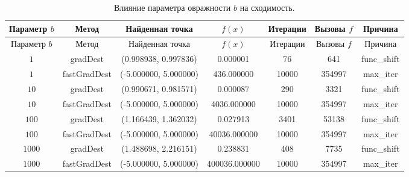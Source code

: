 \begin{longtable}{|c|c|c|c|c|c|c|}
\caption{Влияние параметра овражности $b$ на сходимость.}\label{tab:rosenbrock}\\
\hline
Параметр $b$ & Метод & Найденная точка & $f(x)$ & Итерации & Вызовы $f$ & Причина \\
\hline
\endfirsthead
\hline
Параметр $b$ & Метод & Найденная точка & $f(x)$ & Итерации & Вызовы $f$ & Причина \\
\hline
\endhead
$1$ & gradDest & (0.998938, 0.997836) & 0.000001 & 76 & 641 & func\_shift \\
$1$ & fastGradDest & (-5.000000, 5.000000) & 436.000000 & 10000 & 354997 & max\_iter \\
$10$ & gradDest & (0.990671, 0.981571) & 0.000087 & 290 & 3321 & func\_shift \\
$10$ & fastGradDest & (-5.000000, 5.000000) & 4036.000000 & 10000 & 354997 & max\_iter \\
$100$ & gradDest & (1.166439, 1.362032) & 0.027913 & 3401 & 53138 & func\_shift \\
$100$ & fastGradDest & (-5.000000, 5.000000) & 40036.000000 & 10000 & 354997 & max\_iter \\
$1000$ & gradDest & (1.488698, 2.216151) & 0.238831 & 408 & 7735 & func\_shift \\
$1000$ & fastGradDest & (-5.000000, 5.000000) & 400036.000000 & 10000 & 354997 & max\_iter \\
\hline
\end{longtable}
